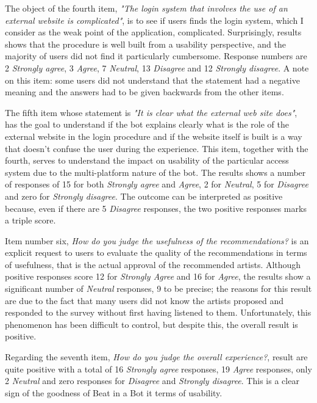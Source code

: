 \documentclass[b5paper,10pt,twoside,cucitura]{toptesi}
\begin{document}
The object of the fourth item, \textit{"The login system that involves the use of an external website is complicated"}, is to see if users finds the login system, which I consider as the weak point of the application, complicated. Surprisingly, results shows that the procedure is well built from a usability perspective, and the majority of users did not find it particularly cumbersome. Response numbers are 2 \textit{Strongly agree}, 3 \textit{Agree}, 7 \textit{Neutral}, 13 \textit{Disagree} and 12 \textit{Strongly disagree}. A note on this item: some users did not understand that the statement had a negative meaning and the answers had to be given backwards from the other items.

The fifth item whose statement is \textit{"It is clear what the external web site does"}, has the goal to understand if the bot explains clearly what is the role of the external website in the login procedure and if the website itself is built is a way that doesn't confuse the user during the experience. This item, together with the fourth, serves to understand the impact on usability of the particular access system due to the multi-platform nature of the bot. The results shows a number of responses of 15 for both \textit{Strongly agree} and \textit{Agree}, 2 for \textit{Neutral}, 5 for \textit{Disagree} and zero for \textit{Strongly disagree}. The outcome can be interpreted as positive because, even if there are 5 \textit{Disagree} responses, the two positive responses marks a triple score.

Item number six, \textit{How do you judge the usefulness of the recommendations?} is an explicit request to users to evaluate the quality of the recommendations in terms of usefulness, that is the actual approval of the recommended artists. Although positive responses score 12 for \textit{Strongly Agree} and 16 for \textit{Agree}, the results show a significant number of \textit{Neutral} responses, 9 to be precise; the reasons for this result are due to the fact that many users did not know the artists proposed and responded to the survey without first having listened to them. Unfortunately, this phenomenon has been difficult to control, but despite this, the overall result is positive.

Regarding the seventh item, \textit{How do you judge the overall experience?}, result are quite positive with a total of 16 \textit{Strongly agree} responses, 19 \textit{Agree} responses, only 2 \textit{Neutral} and zero responses for \textit{Disagree} and \textit{Strongly disagree}. This is a clear sign of the goodness of Beat in a Bot it terms of usability.
\end{document}
